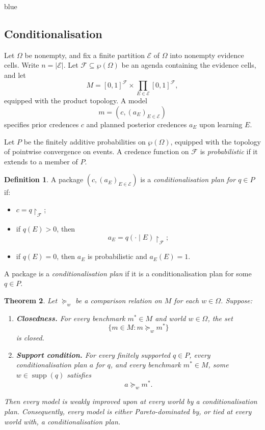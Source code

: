 \documentclass[11pt]{article}
\newtheorem{theorem}{Theorem}[section]
\theoremstyle{definition}
\newtheorem{definition}[theorem]{Definition}
\theoremstyle{remark}
\newcommand{\agenda}{\mathcal F}
\newcommand{\supp}{\operatorname{supp}}
\newenvironment{AIwritten}{\begin{color}{blue}}{\end{color}}
\begin{document}
\begin{AIwritten}
	\subsection{Conditionalisation}\label{appendix:cond}
	
	Let $\Omega$ be nonempty, and fix a finite partition
	$\mathcal E$ of $\Omega$ into nonempty evidence cells.
	Write $n=|\mathcal E|$.
	Let $\agenda\subseteq\wp(\Omega)$ be an agenda containing
	the evidence cells, and let
	\[
	M=[0,1]^\agenda
	\times\prod_{E\in\mathcal E}[0,1]^\agenda,
	\]
	equipped with the product topology.
	A model
	\[
	m=(c,(a_E)_{E\in\mathcal E})
	\]
	specifies prior credences $c$ and planned posterior
	credences $a_E$ upon learning $E$.
	
	Let $P$ be the finitely additive probabilities on
	$\wp(\Omega)$, equipped with the topology of pointwise
	convergence on events. A credence function on $\agenda$
	is \emph{probabilistic} if it extends to a member of $P$.
	
	\begin{definition}
		A package $(c,(a_E)_{E\in\mathcal E})$ is a
		\emph{conditionalisation plan for $q\in P$} if:
		\begin{itemize}
			\item $c=q\upharpoonright_\agenda$;
			\item if $q(E)>0$, then
			\[
			a_E=q(\cdot\mid E)\upharpoonright_\agenda;
			\]
			\item if $q(E)=0$, then $a_E$ is probabilistic
			and $a_E(E)=1$.
		\end{itemize}
		A package is a \emph{conditionalisation plan}
		if it is a conditionalisation plan for some $q\in P$.
	\end{definition}
	
	\begin{theorem}
		Let $\succeq_w$ be a comparison relation on $M$
		for each $w\in\Omega$. Suppose:
		\begin{enumerate}
			\item \textbf{Closedness.}
			For every benchmark $m^*\in M$ and world
			$w\in\Omega$, the set
			\[
			\{m\in M:m\succeq_w m^*\}
			\]
			is closed.
			
			\item \textbf{Support condition.}
			For every finitely supported $q\in P$,
			every conditionalisation plan $a$ for $q$,
			and every benchmark $m^*\in M$, some
			$w\in\supp(q)$ satisfies
			\[
			a\succeq_w m^*.
			\]
		\end{enumerate}
		Then every model is weakly improved upon at every
		world by a conditionalisation plan. Consequently,
		every model is either Pareto-dominated by, or tied
		at every world with, a conditionalisation plan.
		

\end{theorem}
\end{AIwritten}
\end{document}
